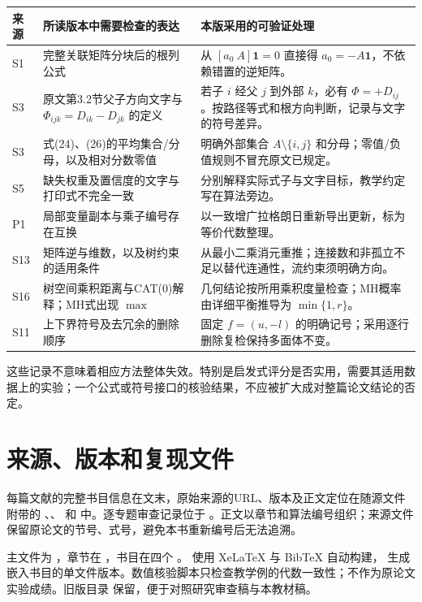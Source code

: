 \documentclass[UTF8,11pt,fontset=fandol,openany,oneside]{ctexbook}
\theoremstyle{definition}
\theoremstyle{remark}
\numberwithin{equation}{chapter}
\begin{document}
\begin{longtable}{p{}p{}p{}}
\toprule 来源 & 所读版本中需要检查的表达 & 本版采用的可验证处理\\\midrule\endhead
S1 & 完整关联矩阵分块后的根列公式 & 从 $[a_0\ A]\mathbf1=0$ 直接得 $a_0=-A\mathbf1$，不依赖错置的逆矩阵。\\
S3 & 原文第3.2节父子方向文字与 $\Phi_{ijk}=D_{ik}-D_{jk}$ 的定义 & 若子 $i$ 经父 $j$ 到外部 $k$，必有 $\Phi=+D_{ij}$。按路径等式和根方向判断，记录与文字的符号差异。\\
S3 & 式(24)、(26)的平均集合/分母，以及相对分数零值 & 明确外部集合 $A\setminus\{i,j\}$ 和分母；零值/负值规则不冒充原文已规定。\\
S5 & 缺失权重及置信度的文字与打印式不完全一致 & 分别解释实际式子与文字目标，教学约定写在算法旁边。\\
P1 & 局部变量副本与乘子编号存在互换 & 以一致增广拉格朗日重新导出更新，标为等价代数整理。\\
S13 & 矩阵逆与维数，以及树约束的适用条件 & 从最小二乘消元重推；连接数和非孤立不足以替代连通性，流约束须明确方向。\\
S16 & 树空间乘积距离与CAT(0)解释；MH式出现 $\max$ & 几何结论按所用乘积度量检查；MH概率由详细平衡推导为 $\min\{1,r\}$。\\
S11 & 上下界符号及去冗余的删除顺序 & 固定 $f=(u,-l)$ 的明确记号；采用逐行删除复检保持多面体不变。\\
\bottomrule
\end{longtable}
这些记录不意味着相应方法整体失效。特别是启发式评分是否实用，需要其适用数据上的实验；一个公式或符号接口的核验结果，不应被扩大成对整篇论文结论的否定。

\section{来源、版本和复现文件}
每篇文献的完整书目信息在文末，原始来源的URL、版本及正文定位在随源文件附带的 、、 和  中。逐专题审查记录位于 。正文以章节和算法编号组织；来源文件保留原论文的节号、式号，避免本书重新编号后无法追溯。

主文件为 ，章节在 ，书目在四个 。 使用 XeLaTeX 与 BibTeX 自动构建， 生成嵌入书目的单文件版本。数值核验脚本只检查教学例的代数一致性；不作为原论文实验成绩。旧版目录  保留，便于对照研究审查稿与本教材稿。
\end{document}
